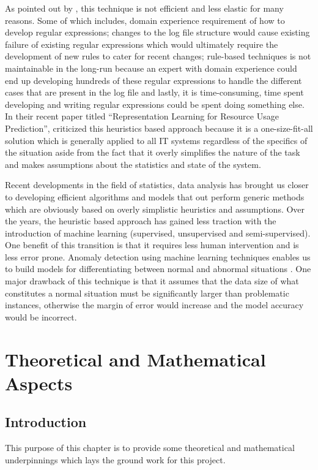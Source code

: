 \documentclass[12pt, letterpaper, titlepage]{report}
\begin{document}
As pointed out by \cite{sebastiani2002machine}, this technique is not efficient and less elastic for many reasons. Some of which includes, domain experience requirement of how to develop regular expressions; changes to the log file structure would cause existing failure of existing regular expressions which would ultimately require the development of new rules to cater for recent changes; rule-based techniques is not maintainable in the long-run because an expert with domain experience could end up developing hundreds of these regular expressions to handle the different cases that are present in the log file and lastly, it is time-consuming, time spent developing and writing regular expressions could be spent doing something else. In their recent paper titled “Representation Learning for Resource Usage Prediction”, \cite{schmidt2018representation} criticized this heuristics based approach because it is a one-size-fit-all solution which is generally applied to all IT systems regardless of the specifics of the situation aside from the fact that it overly simplifies the nature of the task and makes assumptions about the statistics and state of the system.

Recent developments in the field of statistics, data analysis has brought us closer to developing efficient algorithms and models that out perform generic methods which are obviously based on overly simplistic heuristics and assumptions. Over the years, the heuristic based approach has gained less traction with the introduction of machine learning (supervised, unsupervised and semi-supervised). One benefit of this transition is that it requires less human intervention and is less error prone. Anomaly detection using machine learning techniques enables us to build models for differentiating between normal and abnormal situations \citep{chandola2009anomaly}. One major drawback of this technique is that it assumes that the data size of what constitutes a normal situation must be significantly larger than problematic instances, otherwise the margin of error would increase and the model accuracy would be incorrect.


\chapter{Theoretical and Mathematical Aspects}
\section{Introduction}
This purpose of this chapter is to provide some theoretical and mathematical underpinnings which lays the ground work for this project.
\end{document}
